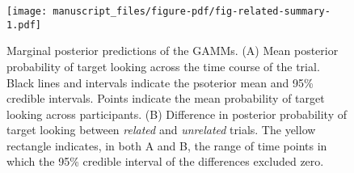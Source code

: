 \documentclass[
  letterpaper,
  DIV=11,
  numbers=noendperiod]{scrartcl}
\begin{document}
\begin{figure}[H]

{\centering \texttt{[image: manuscript\_files/figure-pdf/fig-related-summary-1.pdf]}

}

\caption{\label{fig-related-summary}Marginal posterior predictions of
the GAMMs. (A) Mean posterior probability of target looking across the
time course of the trial. Black lines and intervals indicate the
psoterior mean and 95\% credible intervals. Points indicate the mean
probability of target looking across participants. (B) Difference in
posterior probability of target looking between \emph{related} and
\emph{unrelated} trials. The yellow rectangle indicates, in both A and
B, the range of time points in which the 95\% credible interval of the
differences excluded zero.}

\end{figure}
\end{document}
